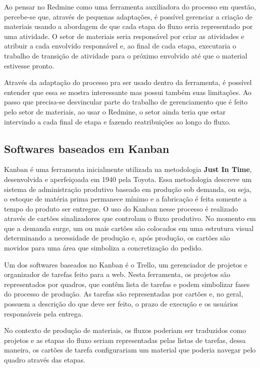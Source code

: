Ao pensar no Redmine como uma ferramenta auxiliadora do processo em questão, percebe-se que, através de pequenas adaptações, é possível gerenciar a criação de materiais usando a abordagem de que cada etapa do fluxo seria representado por uma atividade. O setor de materiais seria responsável por criar as atividades e atribuir a cada envolvido responsável e, ao final de cada etapa, executaria o trabalho de transição de atividade para o próximo envolvido até que o material estivesse pronto.

Através da adaptação do processo pra ser usado dentro da ferramenta, é possível entender que essa se mostra interessante mas possui também suas limitações. Ao passo que precisa-se desvincular parte do trabalho de gerenciamento que é feito pelo setor de materiais, ao usar o Redmine, o setor ainda teria que estar intervindo a cada final de etapa e fazendo reatribuições ao longo do fluxo.

\subsection{Softwares baseados em Kanban}

Kanban é uma ferramenta inicialmente utilizada na metodologia \textbf{Just In Time}, desenvolvida e aperfeiçoada em 1940 pela Toyota. Essa metodologia descreve um sistema de administração produtivo baseado em produção sob demanda, ou seja, o estoque de matéria prima permanece mínimo e a fabricação é feita somente a tempo do produto ser entregue. O uso do Kanban nesse processo é realizado através de cartões sinalizadores que controlam o fluxo produtivo. No momento em que a demanda surge, um ou mais cartões são colocados em uma estrutura visual determinando a necessidade de produção e, após produção, os cartões são movidos para uma área que simboliza a concretização do pedido.

Um dos softwares baseados no Kanban é o Trello, um gerenciador de projetos e organizador de tarefas feito para a web. Nesta ferramenta, os projetos são representados por quadros, que contêm lista de tarefas e podem simbolizar fases do processo de produção. As tarefas são representadas por cartões e, no geral, possuem a descrição do que deve ser feito, o prazo de execução e os usuários responsáveis pela entrega.

No contexto de produção de materiais, os fluxos poderiam ser traduzidos como projetos e as etapas do fluxo seriam representadas pelas listas de tarefas, dessa maneira, os cartões de tarefa configurariam um material que poderia navegar pelo quadro através das etapas.

